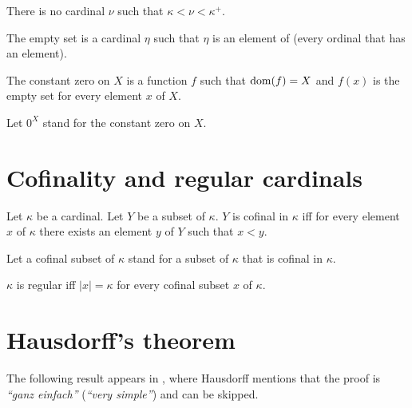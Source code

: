 \documentclass{article}
\newcommand{\Succ}[1]{#1^{+}}
\newcommand{\card}[1]{\left|#1\right|}
\begin{document}
\begin{forthel}
    \begin{axiom}
      There is no cardinal $\nu$ such that $\kappa < \nu < \Succ{\kappa}$.
    \end{axiom}

    \begin{definition}
      The empty set is a cardinal $\eta$ such that $\eta$
      is an element of (every ordinal that has an element).
    \end{definition}

    \begin{definition}
      The constant zero on $X$ is a function $f$ such that $\operatorname{dom}(f) = X$ and $f(x)$ is the empty set for every element $x$ of $X$.
    \end{definition}

    Let $0^X$ stand for the constant zero on $X$.
  \end{forthel}




  \section{Cofinality and regular cardinals}

  \begin{forthel}
    \begin{definition}[Cofinality]
      Let $\kappa$ be a cardinal.
      Let $Y$ be a subset of $\kappa$.
      $Y$ is cofinal in $\kappa$ iff
        for every element $x$ of $\kappa$ there exists an element $y$ of $Y$ such that $x < y$.
    \end{definition}

    Let a cofinal subset of $\kappa$ stand for a subset of $\kappa$ that is cofinal in $\kappa$.


    \begin{definition}
      $\kappa$ is regular iff $\card{x} = \kappa$ for every cofinal subset $x$ of $\kappa$.
    \end{definition}
  \end{forthel}

  \section{Hausdorff's theorem}

  The following result appears in \cite[p.~443]{Hausdorff1908},
  where Hausdorff mentions that the proof is
  \textit{``ganz einfach''} (\textit{``very simple''}) and can be skipped.
\end{document}
